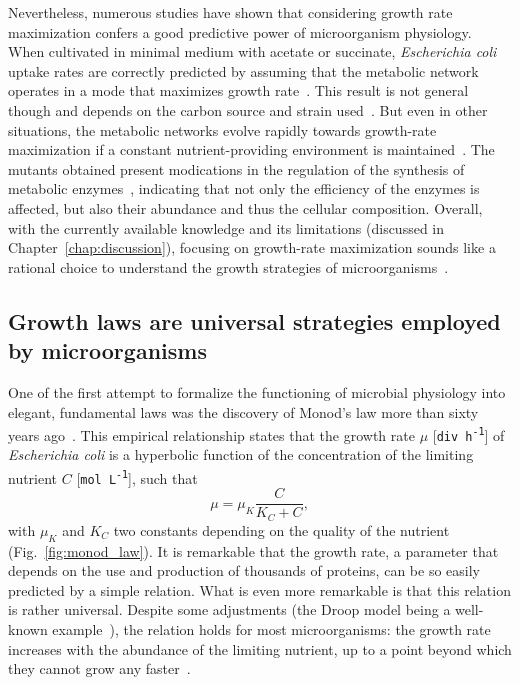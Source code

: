Nevertheless, numerous studies have shown that considering growth rate maximization confers a good predictive power of microorganism physiology.
When cultivated in minimal medium with acetate or succinate, \textit{Escherichia coli} uptake rates are correctly predicted by assuming that the metabolic network operates in a mode that maximizes growth rate~\cite{edwards_silico_2001}.
This result is not general though and depends on the carbon source and strain used~\cite{ibarra_escherichia_2002}.
But even in other situations, the metabolic networks evolve rapidly towards growth-rate maximization if a constant nutrient-providing environment is maintained~\cite{ibarra_escherichia_2002}.
The mutants obtained present modications in the regulation of the synthesis of metabolic enzymes~\cite{lewis_omic_2010}, indicating that not only the efficiency of the enzymes is affected, but also their abundance and thus the cellular composition.
Overall, with the currently available knowledge and its limitations (discussed in Chapter~\ref{chap:discussion}), focusing on growth-rate maximization sounds like a rational choice to understand the growth strategies of microorganisms~\cite{molenaar_shifts_2009}.

\subsection{Growth laws are universal strategies employed by microorganisms}

One of the first attempt to formalize the functioning of microbial physiology into elegant, fundamental laws was the discovery of Monod's law more than sixty years ago~\cite{monod_growth_1949}.
This empirical relationship states that the growth rate $\mu$ [\texttt{div~h\textsuperscript{-1}}] of \textit{Escherichia coli} is a hyperbolic function of the concentration of the limiting nutrient $C$ [\texttt{mol~L\textsuperscript{-1}}], such that
\begin{equation}
\label{eq:monod_law}
\mu = \mu_K \frac{C}{K_C + C},
\end{equation}
with $\mu_K$ and $K_C$ two constants depending on the quality of the nutrient (Fig.~\ref{fig:monod_law}).
It is remarkable that the growth rate, a parameter that depends on the use and production of thousands of proteins, can be so easily predicted by a simple relation.
What is even more remarkable is that this relation is rather universal.
Despite some adjustments (the Droop model being a well-known example~\cite{droop_thoughts_1973}), the relation holds for most microorganisms: the growth rate increases with the abundance of the limiting nutrient, up to a point beyond which they cannot grow any faster~\cite{koch_why_1988}.

